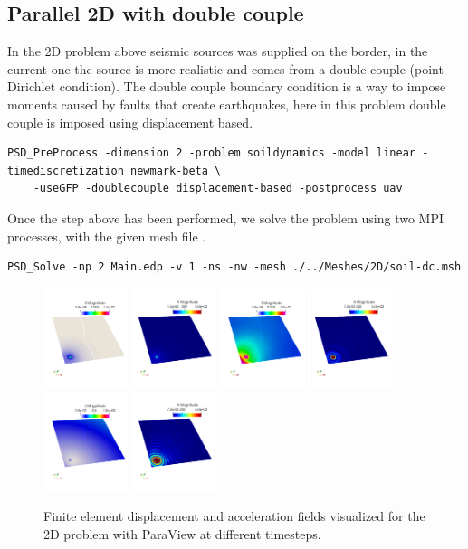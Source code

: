 {{\subsection{Parallel 2D with double couple}

In the 2D problem above seismic sources was supplied on the border, in the current one the source is more realistic and comes from a double couple (point Dirichlet condition). The double couple boundary condition is a way to impose moments caused by faults that create earthquakes, here in this problem double couple is imposed using displacement based. 

\begin{lstlisting}[style=BashInputStyle]
	PSD_PreProcess -dimension 2 -problem soildynamics -model linear -timediscretization newmark-beta \
	-useGFP -doublecouple displacement-based -postprocess uav
\end{lstlisting}

Once the step above has been performed, we solve the problem using two MPI processes, with the given mesh file . 

\begin{lstlisting}[style=BashInputStyle]
	PSD_Solve -np 2 Main.edp -v 1 -ns -nw -mesh ./../Meshes/2D/soil-dc.msh
\end{lstlisting}

\begin{figure}[h!]
	\centering
	\includegraphics[width=0.45\textwidth]{./Images/sd-2ddcu0.png}
	\includegraphics[width=0.45\textwidth]{./Images/sd-2ddcu1.png}\\
	\includegraphics[width=0.45\textwidth]{./Images/sd-2ddcu2.png}
	\caption{Finite element displacement and acceleration fields visualized for the 2D problem with ParaView at different timesteps. \label{bar2ddc-sd}}
\end{figure}

}}
